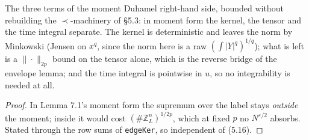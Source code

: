 \begin{lemma}\label{lem:momentduhamelrhs}
  \leanok{}
  The three terms of the moment Duhamel right-hand side, bounded without rebuilding the
  $\prec$-machinery of \S5.3: in moment form the kernel, the tensor and the time integral
  separate.  The kernel is deterministic and leaves the norm by Minkowski (Jensen on $x^q$,
  since the norm here is a raw $(\int|Y|^q)^{1/q}$); what is left is a $\|\cdot\|_{2p}$ bound on
  the tensor alone, which is the reverse bridge of the envelope lemma; and the time integral is
  pointwise in $u$, so no integrability is needed at all.
\end{lemma}
\begin{proof}\leanok
  In Lemma 7.1's moment form the supremum over the label stays \emph{outside} the moment;
  inside it would cost $(\#\mathbb Z_L^n)^{1/2p}$, which at fixed $p$ no $N^{\varepsilon/2}$
  absorbs.  Stated through the row sums of \texttt{edgeKer}, so independent of (5.16).
\end{proof}


